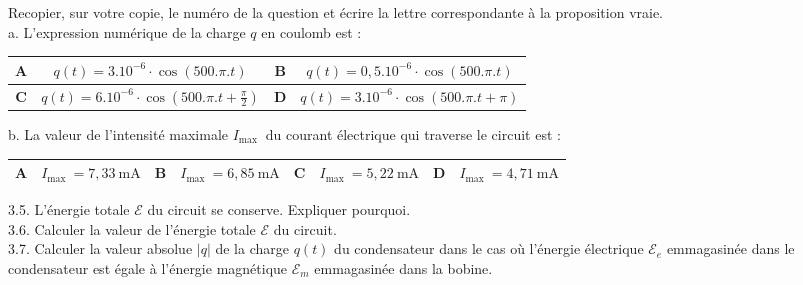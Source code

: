 Recopier, sur votre copie, le numéro de la question et écrire la lettre correspondante à la proposition vraie.\\
a. L'expression numérique de la charge $q$ en coulomb est :

\begin{center}
\begin{tabular}{|c|c|c|c|}
\hline
$\mathbf{A}$ & $q(t)=3.10^{-6} \cdot \cos (500 . \pi . t)$ & $\mathbf{B}$ & $q(t)=0,5.10^{-6} \cdot \cos (500 . \pi . t)$ \\
\hline
$\mathbf{C}$ & $q(t)=6.10^{-6} \cdot \cos \left(500 . \pi . t+\frac{\pi}{2}\right)$ & $\mathbf{D}$ & $q(t)=3.10^{-6} \cdot \cos (500 . \pi . t+\pi)$ \\
\hline
\end{tabular}
\end{center}

b. La valeur de l'intensité maximale $I_{\text {max }}$ du courant électrique qui traverse le circuit est :

\begin{center}
\begin{tabular}{|l|l|l|l|l|l|l|l|}
\hline
$\mathbf{A}$ & $I_{\text {max }}=7,33 \mathrm{~mA}$ & $\mathbf{B}$ & $I_{\text {max }}=6,85 \mathrm{~mA}$ & $\mathbf{C}$ & $I_{\text {max }}=5,22 \mathrm{~mA}$ & $\mathbf{D}$ & $I_{\text {max }}=4,71 \mathrm{~mA}$ \\
\hline
\end{tabular}
\end{center}

3.5. L'énergie totale $\mathcal{E}$ du circuit se conserve. Expliquer pourquoi.\\
3.6. Calculer la valeur de l'énergie totale $\mathcal{E}$ du circuit.\\
3.7. Calculer la valeur absolue $|q|$ de la charge $q(t)$ du condensateur dans le cas où l'énergie électrique $\mathcal{E}_{e}$ emmagasinée dans le condensateur est égale à l'énergie magnétique $\mathcal{E}_{m}$ emmagasinée dans la bobine.




